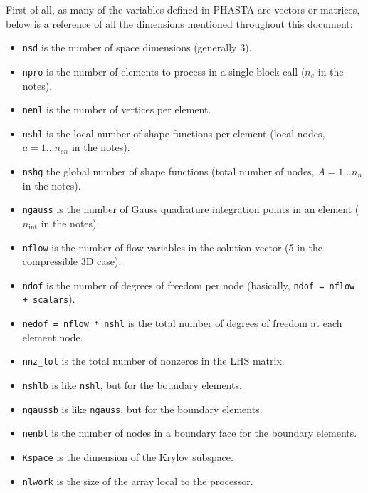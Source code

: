 \documentclass{ucb}
\begin{document}
First of all, as many of the variables defined in PHASTA are vectors or matrices, below is a reference of all the dimensions mentioned throughout this document:
\begin{itemize}
    \item \texttt{nsd} is the number of space dimensions (generally 3).
    \item \texttt{npro} is the number of elements to process in a single block call ($n_e$ in the notes).
    \item \texttt{nenl} is the number of vertices per element.
    \item \texttt{nshl} is the local number of shape functions per element (local nodes, $a = 1 \ldots n_{en} $ in the notes).
    \item \texttt{nshg} the global number of shape functions (total number of nodes, $A = 1 \ldots n_n$ in the notes).
    \item \texttt{ngauss} is the number of Gauss quadrature integration points in an element ($n_{\mathrm{int}}$ in the notes).
    \item \texttt{nflow} is the number of flow variables in the solution vector (5 in the compressible 3D case).
    \item \texttt{ndof} is the number of degrees of freedom per node (basically, \texttt{ndof = nflow + scalars}).
    \item \texttt{nedof = nflow * nshl} is the total number of degrees of freedom at each element node.
    \item \texttt{nnz\_tot} is the total number of nonzeros in the LHS matrix.
    \item \texttt{nshlb} is like \texttt{nshl}, but for the boundary elements.
    \item \texttt{ngaussb} is like \texttt{ngauss}, but for the boundary elements.
    \item \texttt{nenbl} is the number of nodes in a boundary face for the boundary elements.
    \item \texttt{Kspace} is the dimension of the Krylov subspace.
    \item \texttt{nlwork} is the size of the array local to the processor.
\end{itemize}
\end{document}
